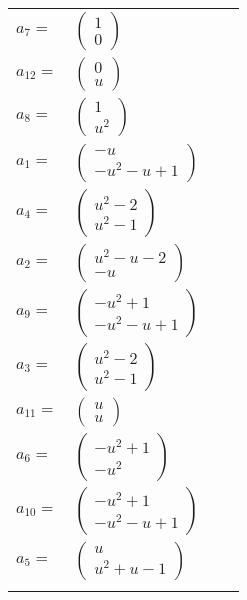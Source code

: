 \documentclass[1p]{elsarticle_modified}
\theoremstyle{definition}
\begin{document}
\begin{tabular}{m{7pt} m{180pt} m{7pt} m{180pt} }
\flushright $a_{7}=$&$\begin{pmatrix}1\\0\end{pmatrix}$ \\
\flushright $a_{12}=$&$\begin{pmatrix}0\\u\end{pmatrix}$ \\
\flushright $a_{8}=$&$\begin{pmatrix}1\\u^2\end{pmatrix}$ \\
\flushright $a_{1}=$&$\begin{pmatrix}- u\\- u^2- u+1\end{pmatrix}$ \\
\flushright $a_{4}=$&$\begin{pmatrix}u^2-2\\u^2-1\end{pmatrix}$ \\
\flushright $a_{2}=$&$\begin{pmatrix}u^2- u-2\\- u\end{pmatrix}$ \\
\flushright $a_{9}=$&$\begin{pmatrix}- u^2+1\\- u^2- u+1\end{pmatrix}$ \\
\flushright $a_{3}=$&$\begin{pmatrix}u^2-2\\u^2-1\end{pmatrix}$ \\
\flushright $a_{11}=$&$\begin{pmatrix}u\\u\end{pmatrix}$ \\
\flushright $a_{6}=$&$\begin{pmatrix}- u^2+1\\- u^2\end{pmatrix}$ \\
\flushright $a_{10}=$&$\begin{pmatrix}- u^2+1\\- u^2- u+1\end{pmatrix}$ \\
\flushright $a_{5}=$&$\begin{pmatrix}u\\u^2+u-1\end{pmatrix}$\\&\end{tabular}
\end{document}
